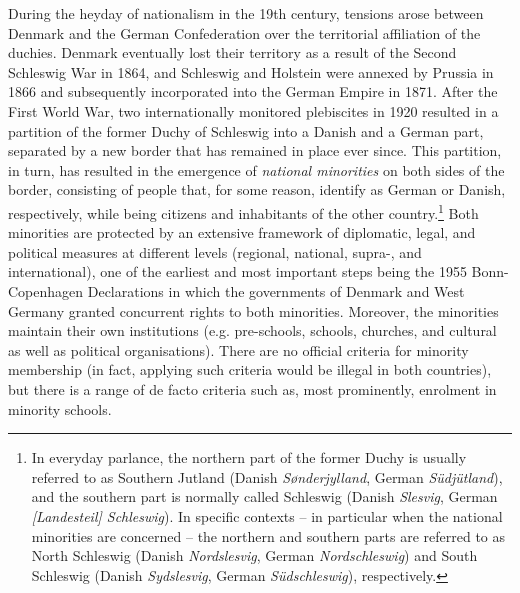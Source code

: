 \documentclass[output=paper]{langsci/langscibook}
\begin{document}
During the heyday of nationalism in the 19th century, tensions arose between Denmark and the German Confederation over the territorial affiliation of the duchies. Denmark eventually lost their territory as a result of the Second Schleswig War in 1864, and Schleswig and Holstein were annexed by Prussia in 1866 and subsequently incorporated into the German Empire in 1871. After the First World War, two internationally monitored plebiscites in 1920 resulted in a partition of the former Duchy of Schleswig into a Danish and a German part, separated by a new border that has remained in place ever since. This partition, in turn, has resulted in the emergence of \textit{national minorities} on both sides of the border, consisting of people that, for some reason, identify as German or Danish, respectively, while being citizens and inhabitants of the other country.\footnote{In everyday parlance, the northern part of the former Duchy is usually referred to as Southern Jutland (Danish \textit{Sønderjylland}, German \textit{Südjütland}), and the southern part is normally called Schleswig (Danish \textit{Slesvig}, German \textit{[Landesteil] Schleswig}). In specific contexts – in particular when the national minorities are concerned – the northern and southern parts are referred to as North Schleswig (Danish \textit{Nordslesvig}, German \textit{Nordschleswig}) and South Schleswig (Danish \textit{Sydslesvig}, German \textit{Südschleswig}), respectively.} Both minorities are protected by an extensive framework of diplomatic, legal, and political measures at different levels (regional, national, supra-, and international), one of the earliest and most important steps being the 1955 Bonn-Copenhagen Declarations in which the governments of Denmark and West Germany granted concurrent rights to both minorities. Moreover, the minorities maintain their own institutions (e.g. pre-schools, schools, churches, and cultural as well as political organisations). There are no official criteria for minority membership (in fact, applying such criteria would be illegal in both countries), but there is a range of de facto criteria such as, most prominently, enrolment in minority schools.
\end{document}
